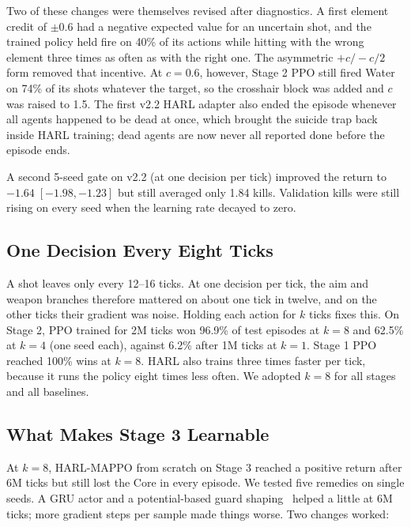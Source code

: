 \documentclass[11pt]{article}
\begin{document}
Two of these changes were themselves revised after diagnostics. A first element credit of $\pm 0.6$ had a negative expected value for an uncertain shot, and the trained policy held fire on 40\% of its actions while hitting with the wrong element three times as often as with the right one. The asymmetric $+c / -c/2$ form removed that incentive. At $c = 0.6$, however, Stage 2 PPO still fired Water on 74\% of its shots whatever the target, so the crosshair block was added and $c$ was raised to 1.5. The first v2.2 HARL adapter also ended the episode whenever all agents happened to be dead at once, which brought the suicide trap back inside HARL training; dead agents are now never all reported done before the episode ends.

A second 5-seed gate on v2.2 (at one decision per tick) improved the return to $-1.64\;[-1.98, -1.23]$ but still averaged only 1.84 kills. Validation kills were still rising on every seed when the learning rate decayed to zero.

\subsection{One Decision Every Eight Ticks}
\label{sec:dev-repeat}

A shot leaves only every 12--16 ticks. At one decision per tick, the aim and weapon branches therefore mattered on about one tick in twelve, and on the other ticks their gradient was noise. Holding each action for $k$ ticks fixes this. On Stage 2, PPO trained for 2M ticks won 96.9\% of test episodes at $k = 8$ and 62.5\% at $k = 4$ (one seed each), against 6.2\% after 1M ticks at $k = 1$. Stage 1 PPO reached 100\% wins at $k = 8$. HARL also trains three times faster per tick, because it runs the policy eight times less often. We adopted $k = 8$ for all stages and all baselines.

\subsection{What Makes Stage 3 Learnable}
\label{sec:dev-learn}

At $k = 8$, HARL-MAPPO from scratch on Stage 3 reached a positive return after 6M ticks but still lost the Core in every episode. We tested five remedies on single seeds. A GRU actor and a potential-based guard shaping~\cite{ng1999shaping} helped a little at 6M ticks; more gradient steps per sample made things worse. Two changes worked:
\end{document}
